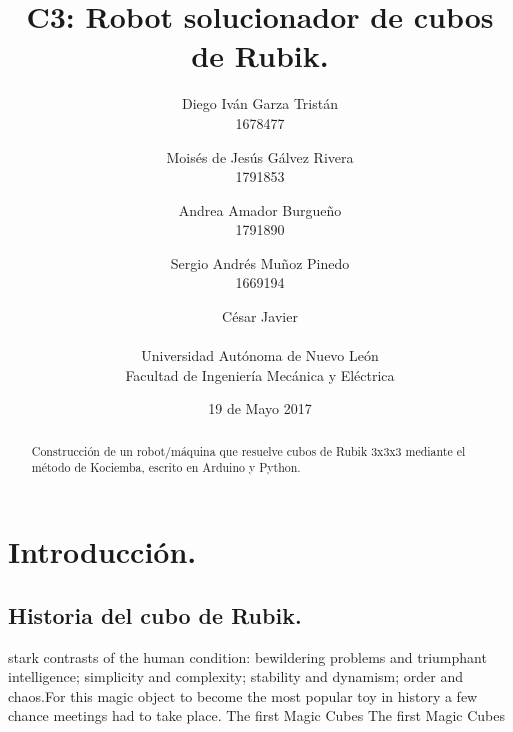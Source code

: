 \documentclass[12pt, letterpaper]{article}
\author{
Diego Iván Garza Tristán\\
1678477
\and
Moisés de Jesús Gálvez Rivera\\
1791853
\and
Andrea Amador Burgueño\\
1791890
\and
Sergio Andrés Muñoz Pinedo\\
1669194
\and
César Javier\\
\\
Universidad Autónoma de Nuevo León \\
Facultad de Ingeniería Mecánica y Eléctrica \\
}
\title{C3: Robot solucionador de cubos de Rubik.}
\date{19 de Mayo 2017}
\begin{document}
\maketitle
\newpage
\begin{abstract}
Construcción de un robot/máquina que resuelve cubos de Rubik 3x3x3 mediante el método de Kociemba, escrito en Arduino y Python.
\end{abstract}

\section{Introducción.}
\subsection{Historia del cubo de Rubik.}
stark contrasts of the human condition: bewildering problems and triumphant intelligence; simplicity and complexity; stability and dynamism; order and chaos.For this magic object to become the most popular toy in history a few chance meetings had to take place.  The first Magic Cubes
The first Magic Cubes
\end{document}
